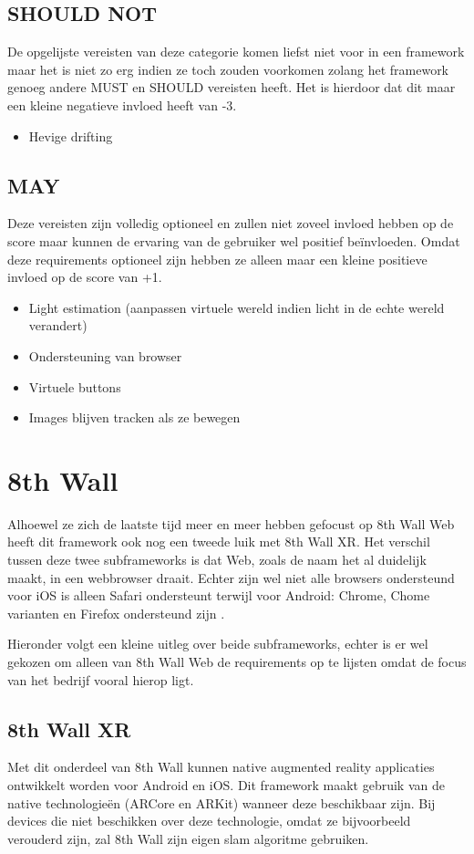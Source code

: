 \subsection{SHOULD NOT}
De opgelijste vereisten van deze categorie komen liefst niet voor in een framework maar het is niet zo erg indien ze toch zouden voorkomen zolang het framework genoeg andere MUST en SHOULD vereisten heeft. Het is hierdoor dat dit maar een kleine negatieve invloed heeft van -3.
\begin{itemize}
    \item Hevige drifting
\end{itemize} 

\subsection{MAY}
Deze vereisten zijn volledig optioneel en zullen niet zoveel invloed hebben op de score maar kunnen de ervaring van de gebruiker wel positief beïnvloeden. Omdat deze requirements optioneel zijn hebben ze alleen maar een kleine positieve invloed op de score van +1.
\begin{itemize}
    \item Light estimation (aanpassen virtuele wereld indien licht in de echte wereld verandert)
    \item Ondersteuning van browser
     \item Virtuele buttons
     \item Images blijven tracken als ze bewegen
\end{itemize} 

\section{8th Wall}
Alhoewel ze zich de laatste tijd meer en meer hebben gefocust op 8th Wall Web heeft dit framework ook nog een tweede luik met 8th Wall XR. Het verschil tussen deze twee subframeworks is dat Web, zoals de naam het al duidelijk maakt, in een webbrowser draait. Echter zijn wel niet alle browsers ondersteund voor iOS is alleen Safari ondersteunt terwijl voor Android: Chrome, Chome varianten en Firefox ondersteund zijn \autocite{8thWallWebReq}.

Hieronder volgt een kleine uitleg over beide subframeworks, echter is er wel gekozen om alleen van 8th Wall Web de requirements op te lijsten omdat de focus van het bedrijf vooral hierop ligt.

\subsection{8th Wall XR}
Met dit onderdeel van 8th Wall kunnen native augmented reality applicaties ontwikkelt worden voor Android en iOS. Dit framework maakt gebruik van de native technologieën (ARCore en ARKit) wanneer deze beschikbaar zijn. Bij devices die niet beschikken over deze technologie, omdat ze bijvoorbeeld verouderd zijn, zal 8th Wall zijn eigen \acrshort{slam} algoritme gebruiken.


